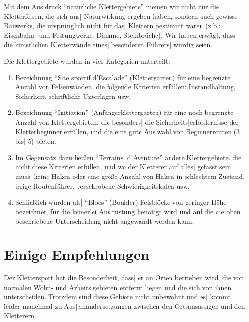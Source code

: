 \documentclass[12pt]{article}
\def\3{\ss}
\def\<{``}
\def\>{''}
\begin{document}
Mit dem Aus|druck \<nat\"urliche Klettergebiete\> meinen wir nicht nur die
Kletterfelsen, die sich aus| Naturwirkung ergeben haben, sondern auch gewisse
Bauwerke, die urspr\"unglich nicht f\"ur das| Klettern
bestimmt waren (z.b.: Eisenbahn- und Festungwerke, D\"amme, Steinbr\"uche).
Wir haben erw\"agt, das{}s| die k\"unstlichen Kletterw\"ande eines| besonderen
F\"uhrers| w\"urdig seien.

 Die Klettergebiete wurden in vier Kategorien unterteilt:

 \begin{enumerate}

 \item Bezeichnung \<Site sportif d'Escalade\> (Klettergarten) f\"ur eine
be\-grenz\-te An\-zahl von Felsenw\"anden, die folgende Kriterien
erf\"ullen: Instand\-haltung, Sicherheit, schriftliche Unterlagen usw.

 \item Bezeichnung \<Initiation\> (Anf\"anger\-klettergarten) f\"ur eine noch
begrenzte Anzahl von Klettergebieten, die besonders| die
Sicherheits|\-erfordernisse der Kletter\-beginner erf\"ullen, und die eine
gute Aus|wahl von Beginner\-routen (3 bis| 5) bieten.

 \item Im Gegensatz dazu hei\3en \<Terrains| d'Aventure\> andere
Klettergebiete, die nicht diese Kriterien erf\"ullen, und wo der Kletterer auf
alles| gefasst sein muss: keine Haken oder eine gro\3e Anzahl von Haken in
schlechtem Zustand, irrige Routenf\"uhrer, verschrobene Schwierigkeitskalen
usw.

 \item Schlie\3lich wurden als| \<Blocs\> (Boulder) Felsbl\"ocke von geringer
H\"ohe be\-zeich\-net, f\"ur die keinerlei Aus|r\"ustung ben\"otigt wird und
auf die die oben beschriebene Unterscheidung nicht angewandt werden kann.

 \end{enumerate}
\section{Einige Empfehlungen} \rm

 Der Klettersport hat die Besonderheit, das{}s| er an Orten
betrieben wird, die von normalen Wohn- und Arbeits|gebieten entfernt
liegen und die sich von ihnen unterscheiden. Trotzdem sind diese
Gebiete nicht unbewohnt und es| kommt leider manchmal zu
Aus|einandersetzungen zwischen den Ortsans\"assigen und den Kletterern.
\end{document}
